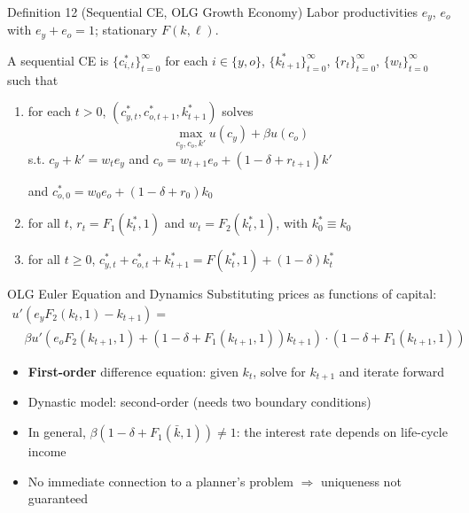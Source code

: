 \documentclass[blue]{beamer}
\begin{document}
\begin{frame}{Definition 12 (Sequential CE, OLG Growth Economy)}
	\small
	Labor productivities $e_y$, $e_o$ with $e_y + e_o = 1$; stationary $F(k, \ell)$.
	
	\medskip
	A sequential CE is $\{c_{i,t}^*\}_{t=0}^{\infty}$ for each $i \in \{y,o\}$, $\{k_{t+1}^*\}_{t=0}^{\infty}$, $\{r_t\}_{t=0}^{\infty}$, $\{w_t\}_{t=0}^{\infty}$ such that
	
	\begin{enumerate}
		\item for each $t > 0$, $(c_{y,t}^*, c_{o,t+1}^*, k_{t+1}^*)$ solves
		\[
		\max_{c_y, c_o, k'} u(c_y) + \beta u(c_o)
		\]
		s.t. $c_y + k' = w_t e_y$ and $c_o = w_{t+1} e_o + (1\!-\!\delta\!+\!r_{t+1}) k'$
		
		and $c_{o,0}^* = w_0 e_o + (1\!-\!\delta\!+\!r_0) k_0$
		
		\item for all $t$, $r_t = F_1(k_t^*, 1)$ and $w_t = F_2(k_t^*, 1)$, with $k_0^* \equiv k_0$
		
		\item for all $t \geq 0$, $c_{y,t}^* + c_{o,t}^* + k_{t+1}^* = F(k_t^*, 1) + (1\!-\!\delta)k_t^*$
	\end{enumerate}
\end{frame}

\begin{frame}{OLG Euler Equation and Dynamics}
	Substituting prices as functions of capital:
	\[
	\begin{array}{l}
		u'(e_y F_2(k_t,1) - k_{t+1}) =\\
	\quad	\beta u'(e_o F_2(k_{t+1},1) + (1\!-\!\delta\!+\!F_1(k_{t+1},1))k_{t+1}) \cdot (1\!-\!\delta\!+\!F_1(k_{t+1},1))
		\end{array}
	\]
	
	\begin{itemize}
		\item \textbf{First-order} difference equation: given $k_t$, solve for $k_{t+1}$ and iterate forward
		\item Dynastic model: second-order (needs two boundary conditions)
		\item In general, $\beta(1-\delta+F_1(\bar{k},1)) \neq 1$: the interest rate depends on life-cycle income
		\item No immediate connection to a planner's problem $\Rightarrow$ uniqueness not guaranteed
	\end{itemize}
\end{frame}
\end{document}
